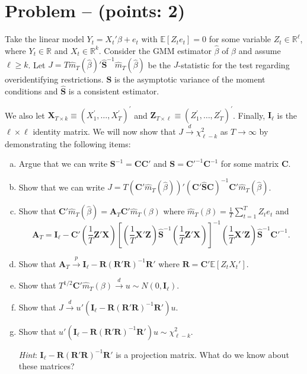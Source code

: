 \documentclass[11pt]{article}
\theoremstyle{definition}
\newcommand{\E}{\mathbb{E}}
\newcommand{\symbf}[1]{\boldsymbol{#1}}
\newcounter{problem}
\renewcommand{\theproblem}{\arabic{problem}}
\newcommand{\problem}[1]{
	\stepcounter{problem}
	\section*{Problem \theproblem{} -- (points: #1)}
}
\begin{document}
\problem{2}
Take the linear model $Y_t = X_t'\beta + e_t$ with $\E[Z_te_t] = 0$ for some variable $Z_t \in \mathbb{R}^\ell$, where $Y_t \in \mathbb{R}$ and $X_t \in \mathbb{R}^{k}$. Consider the GMM estimator $\hat{\beta}$ of $\beta$ and assume $\ell \geq k$. Let $J = T\hat{m}_T(\hat{\beta})'\hat{\symbf{S}}^{-1}\hat{m}_T(\hat{\beta})$ be the $J$-statistic for the test regarding overidentifying restrictions. $\symbf{S}$ is the asymptotic variance of the moment conditions and $\hat{\symbf{S}}$ is a consistent estimator. 

We also let $\symbf{X}_{T\times k} \equiv (X_1^{\prime}, \ldots, X_T^{\prime})^{\prime}$ and $\symbf{Z}_{T\times \ell} \equiv (Z_1^{\prime}, \ldots, Z_T^{\prime})^{\prime}$. Finally, $\symbf{I}_\ell$ is the $\ell \times \ell$ identity matrix. We will now show that $J \xrightarrow{d} \chi^2_{\ell-k}$ as $T \to \infty$ by demonstrating the following items:

\begin{enumerate}[a)]
	\item Argue that we can write $\symbf{S}^{-1} = \symbf{C}\symbf{C}'$ and $\symbf{S} = \symbf{C}'^{-1}\symbf{C}^{-1}$ for some matrix $\symbf{C}$.
	
	\item Show that we can write $J = T\left(\symbf{C}'\hat{m}_T(\hat{\beta})\right)' \left(\symbf{C}'\hat{\symbf{S}}\symbf{C}\right)^{-1} \symbf{C}'\hat{m}_T(\hat{\beta})$.
	
	\item Show that $\symbf{C}'\hat{m}_T(\hat{\beta}) = \symbf{A}_T\symbf{C}'\hat{m}_T(\beta)$ where $\hat{m}_T(\beta) = \frac{1}{T}\sum\limits_{t=1}^T Z_t e_t$ and
	$$
	\symbf{A}_T = \symbf{I}_\ell - \symbf{C}'\left(\frac{1}{T}\symbf{Z}'\symbf{X}\right)\left[\left(\frac{1}{T}\symbf{X}'\symbf{Z}\right)\hat{\symbf{S}}^{-1}\left(\frac{1}{T}\symbf{Z}'\symbf{X}\right)\right]^{-1}\left(\frac{1}{T}\symbf{X}'\symbf{Z}\right)\hat{\symbf{S}}^{-1}\symbf{C}'^{-1}.
	$$
	
	\item Show that $\symbf{A}_T \xrightarrow{p} \symbf{I}_\ell - \symbf{R}(\symbf{R}'\symbf{R})^{-1}\symbf{R}'$ where $\symbf{R} = \symbf{C}'\E[Z_tX_t']$.
	
	\item Show that $T^{1/2}\symbf{C}'\hat{m}_T(\beta) \xrightarrow{d} u \sim N(0, \symbf{I}_\ell)$.
	
	\item Show that $J \xrightarrow{d} u'\left(\symbf{I}_\ell - \symbf{R}(\symbf{R}'\symbf{R})^{-1}\symbf{R}'\right)u$.
	
	\item Show that $u'\left(\symbf{I}_\ell - \symbf{R}(\symbf{R}'\symbf{R})^{-1}\symbf{R}'\right)u \sim \chi^2_{\ell-k}$.
	
	\textit{Hint}: $\symbf{I}_\ell - \symbf{R}(\symbf{R}'\symbf{R})^{-1}\symbf{R}'$ is a projection matrix. What do we know about these matrices?
\end{enumerate}
\end{document}
